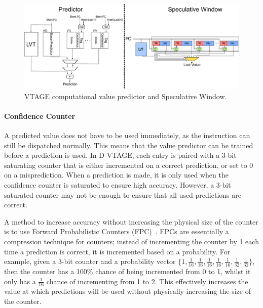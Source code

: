 \begin{figure}[t]
    \centering
    \includegraphics[width=1\textwidth]{background/graphics/valuepred.pdf}
	\vspace{-3em}
    \caption{VTAGE computational value predictor and Speculative Window.}
    \label{fig:stride_over}
	\vspace{-1em}
\end{figure}

\paragraph*{Confidence Counter}
A predicted value does not have to be used immediately, as the instruction can still be dispatched normally.
This means that the value predictor can be trained before a prediction is used.
In D-VTAGE, each entry is paired with a 3-bit saturating counter that is either incremented on a correct prediction, or set to 0 on a misprediction.
When a prediction is made, it is only used when the confidence counter is saturated to ensure high accuracy.
However, a 3-bit saturated counter may not be enough to ensure that all used predictions are correct.

A method to increase accuracy without increasing the physical size of the counter is to use Forward Probabilistic Counters (FPC)~\cite{riley2006fpc}.
FPCs are essentially a compression technique for counters; instead of incrementing the counter by 1 each time a prediction is correct, it is incremented based on a probability.
For example, given a 3-bit counter and a probability vector  $\{1,\frac{1}{16},\frac{1}{16},\frac{1}{16},\frac{1}{16},\frac{1}{16},\frac{1}{32},\frac{1}{32}\}$, then the counter has a 100\% chance of being incremented from 0 to 1, whilst it only has a $\frac{1}{16}$ chance of incrementing from 1 to 2.
This effectively increases the value at which predictions will be used without physically increasing the size of the counter. 

